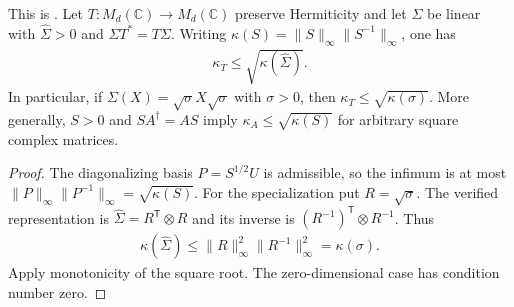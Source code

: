 \begin{theorem}
    \label{thm:detailed_balance_jordan_condition}
    \leanok
    This is \cite[Proposition~8.5]{Wolf2012Quantum}.
    Let $T:M_d(\mathbb C)\to M_d(\mathbb C)$ preserve Hermiticity and
    let $\Sigma$ be linear with $\widehat\Sigma>0$ and $\Sigma T^*=T\Sigma$.
    Writing $\kappa(S)=\lVert S\rVert_\infty\lVert S^{-1}\rVert_\infty$, one has
    \begin{align}
      \kappa_T\le\sqrt{\kappa(\widehat\Sigma)}.
    \end{align}
    In particular, if $\Sigma(X)=\sqrt\sigma X\sqrt\sigma$ with $\sigma>0$,
    then $\kappa_T\le\sqrt{\kappa(\sigma)}$.
    More generally, $S>0$ and $SA^\dagger=AS$ imply
    $\kappa_A\le\sqrt{\kappa(S)}$ for arbitrary square complex matrices.
\end{theorem}
\begin{proof}
    \leanok
    The diagonalizing basis $P=S^{1/2}U$ is admissible, so the infimum
    is at most $\lVert P\rVert_\infty\lVert P^{-1}\rVert_\infty
    =\sqrt{\kappa(S)}$.
    For the specialization put $R=\sqrt\sigma$. The verified representation
    is $\widehat\Sigma=R^{\mathsf T}\otimes R$ and its inverse is
    $(R^{-1})^{\mathsf T}\otimes R^{-1}$. Thus
    \begin{align}
      \kappa(\widehat\Sigma)
      \le\lVert R\rVert_\infty^2\lVert R^{-1}\rVert_\infty^2
      =\kappa(\sigma).
    \end{align}
    Apply monotonicity of the square root. The zero-dimensional case has
    condition number zero.
\end{proof}
